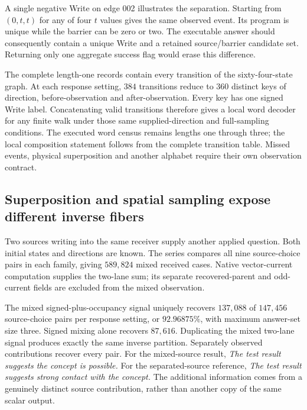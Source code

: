 A single negative Write on edge 002 illustrates the separation. Starting from $(0,t,t)$ for any of four $t$ values gives the same observed event. Its program is unique while the barrier can be zero or two. The executable answer should consequently contain a unique Write and a retained source/barrier candidate set. Returning only one aggregate success flag would erase this difference.

The complete length-one records contain every transition of the sixty-four-state graph. At each response setting, $384$ transitions reduce to $360$ distinct keys of direction, before-observation and after-observation. Every key has one signed Write label. Concatenating valid transitions therefore gives a local word decoder for any finite walk under those same supplied-direction and full-sampling conditions. The executed word census remains lengths one through three; the local composition statement follows from the complete transition table. Missed events, physical superposition and another alphabet require their own observation contract.

\subsection{Superposition and spatial sampling expose different inverse fibers}

Two sources writing into the same receiver supply another applied question. Both initial states and directions are known. The series compares all nine source-choice pairs in each family, giving $589{,}824$ mixed received cases. Native vector-current computation supplies the two-lane sum; its separate recovered-parent and odd-current fields are excluded from the mixed observation. 

The mixed signed-plus-occupancy signal uniquely recovers $137{,}088$ of $147{,}456$ source-choice pairs per response setting, or $92.96875\%$, with maximum answer-set size three. Signed mixing alone recovers $87{,}616$. Duplicating the mixed two-lane signal produces exactly the same inverse partition. Separately observed contributions recover every pair. For the mixed-source result, \emph{The test result suggests the concept is possible.} For the separated-source reference, \emph{The test result suggests strong contact with the concept.} The additional information comes from a genuinely distinct source contribution, rather than another copy of the same scalar output.

